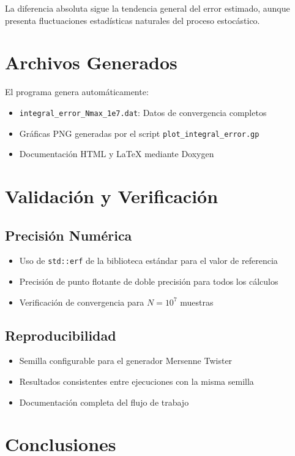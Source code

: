 \documentclass[11pt,a4paper]{article}
\begin{document}
La diferencia absoluta sigue la tendencia general del error estimado, aunque presenta fluctuaciones estadísticas naturales del proceso estocástico.

\section{Archivos Generados}

El programa genera automáticamente:
\begin{itemize}
    \item \texttt{integral\_error\_Nmax\_1e7.dat}: Datos de convergencia completos
    \item Gráficas PNG generadas por el script \texttt{plot\_integral\_error.gp}
    \item Documentación HTML y LaTeX mediante Doxygen
\end{itemize}

\section{Validación y Verificación}

\subsection{Precisión Numérica}
\begin{itemize}
    \item Uso de \texttt{std::erf} de la biblioteca estándar para el valor de referencia
    \item Precisión de punto flotante de doble precisión para todos los cálculos
    \item Verificación de convergencia para $N = 10^7$ muestras
\end{itemize}

\subsection{Reproducibilidad}
\begin{itemize}
    \item Semilla configurable para el generador Mersenne Twister
    \item Resultados consistentes entre ejecuciones con la misma semilla
    \item Documentación completa del flujo de trabajo
\end{itemize}

\section{Conclusiones}
\end{document}

